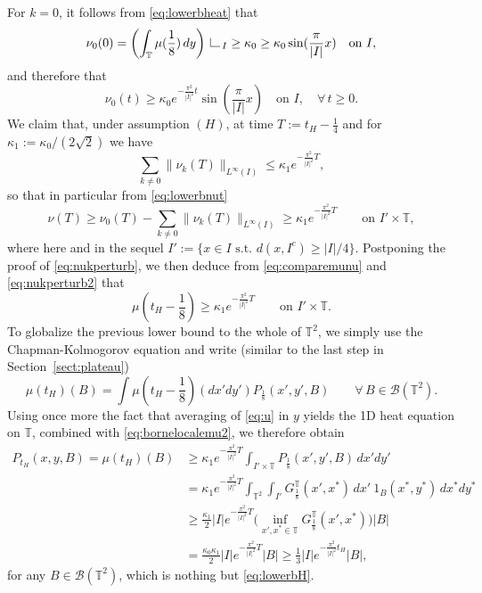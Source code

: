 \documentclass[12pt]{article}
\newcommand{\T}{\mathbb{T}}
\def\rest{\hskip 1pt{\hbox to 10.8pt{\hfill
\vrule height 7pt width 0.4pt depth 0pt\hbox{\vrule height 0.4pt
width 7.6pt depth 0pt}\hfill}}}
\begin{document}
For $k = 0$, it follows from \eqref{eq:lowerbheat} that 
\begin{equation}\label{eq:lowerbnu0}
\nu_0(0) = \left(\int_{\T} \mu(\frac18)\, dy\right) \rest_{I} 
\geq \kappa_0 \geq \kappa_0 \sin(\frac{\pi}{|I|}x) \quad \text{on } I,
\end{equation}
and therefore that
\begin{equation}\label{eq:lowerbnut}
\nu_0(t) \geq \kappa_0 e^{-\frac{\pi^2}{|I|^2}t}
\sin(\frac{\pi}{|I|}x) \quad \text{on } I, \quad \forall\, t \geq 0.
\end{equation}
We claim that, under assumption $(H)$, at time $T := t_H - \frac14$ and for $\kappa_1 :=
\kappa_0/(2\sqrt{2})$ we have  
\begin{equation}\label{eq:nukperturb}
\sum_{k \neq 0} \|\nu_k(T)\|_{L^\infty(I)} \leq \kappa_1 e^{-\frac{\pi^2}{|I|^2}T},
\end{equation}
so that in particular from \eqref{eq:lowerbnut}
\begin{equation}\label{eq:nukperturb2}
\nu(T) \geq \nu_0(T) - \sum_{k \neq 0} \|\nu_k(T)\|_{L^\infty(I)}
\geq \kappa_1e^{-\frac{\pi^2}{|I|^2}T} \qquad\text{on } I'\times \T,
\end{equation}
where here and in the sequel $I' := \{x \in I \text{ s.t. } d(x,I^c) \geq
|I|/4\}.$ Postponing the proof of \eqref{eq:nukperturb}, we then deduce from 
 \eqref{eq:comparemunu} and \eqref{eq:nukperturb2} that
\begin{equation}\label{eq:bornelocalemu2}
\mu(t_H - \frac18) \geq \kappa_1e^{-\frac{\pi^2}{|I|^2}T} \qquad \text{on } I'\times \T.
\end{equation}
To globalize the previous lower bound to the whole of $\T^2$, we simply
use the Chapman-Kolmogorov equation and write (similar to the last step in Section~\ref{sect:plateau})
$$
\mu(t_H)(B) = \int \mu(t_H - \frac18)(dx'dy') P_\frac18(x',y',B) \qquad \forall\,
B \in \mathcal{B}(\T^2). 
$$
Using once more the fact that averaging of \eqref{eq:u} in $y$ yields the 
1D heat equation on $\T$, combined with \eqref{eq:bornelocalemu2}, we therefore obtain
\begin{equation*}\begin{split}
P_{t_H}(x,y, B) = \mu(t_H)(B) &\geq \kappa_1 e^{-\frac{\pi^2}{|I|^2}T} \int_{I'\times \T}
P_\frac18(x',y', B) \, dx'dy'\\
&= \kappa_1 e^{-\frac{\pi^2}{|I|^2}T} \int_{\T^2}\int_{I'}
G_\frac18^\T(x',x^*) \, dx'\: 1_{B}(x^*,y^*)\, dx^*dy^*\\
&\geq \frac{\kappa_1}{2}|I| e^{-\frac{\pi^2}{|I|^2}T}\Big(\inf_{x',x^* \in
\T}G_\frac18^\T(x',x^*)\Big) |B|\\
&= \frac{\kappa_0\kappa_1}{2}|I|e^{-\frac{\pi^2}{|I|^2}T} |B| \geq
\frac{1}{3}|I| e^{-\frac{\pi^2}{|I|^2}t_H} |B|,
\end{split}
\end{equation*}
for any $B \in \mathcal{B}(\T^2)$, which is nothing but \eqref{eq:lowerbH}. 
\end{document}
